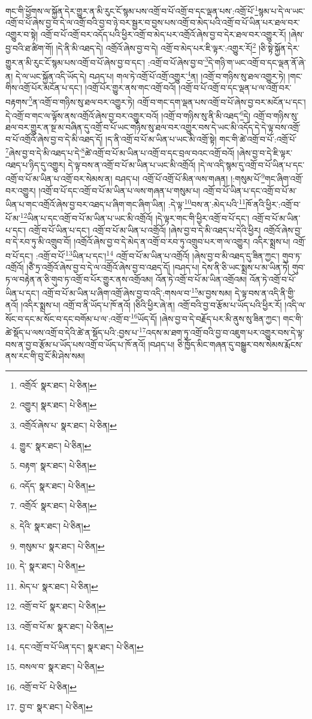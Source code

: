 གང་གི་ཕྱོགས་ལ་སྐྱོན་དེར་གྱུར་ན་མི་རུང་ངོ་སྙམ་པས་འགྲོ་བ་པོ་འགྲོ་བ་དང་ལྡན་པས་:འགྲོ་པོ་\footnote{འགྲོའོ་  སྣར་ཐང་།  པེ་ཅིན། }སྙམ་པ་དེ་ལ་ཡང་འགྲོ་བ་པོ་ཞེས་བྱ་བ་དེ་ལ་འགྲོ་བའི་བྱ་བ་ཉེ་བར་སྦྱར་བ་བྱས་པས་འགྲོ་བ་མེད་པའི་འགྲོ་བ་པོ་ཡིན་པར་ཐལ་བར་འགྱུར་བ་སྟེ། འགྲོ་བ་པོ་འགྲོ་བར་འདོད་པའི་ཕྱིར་འགྲོ་བ་མེད་པར་འགྲོའོ་ཞེས་བྱ་བ་དེར་ཐལ་བར་འགྱུར་རོ། །ཞེས་བྱ་བའི་ཐ་ཚིག་གོ། །དེ་ནི་མི་འཐད་དེ། འགྲོའོ་ཞེས་བྱ་བ་དེ། འགྲོ་བ་མེད་པར་ཇི་ལྟར་:འགྱུར་རོ།\footnote{འགྱུར།  སྣར་ཐང་།  པེ་ཅིན། } །ཅི་སྟེ་སྐྱོན་དེར་གྱུར་ན་མི་རུང་ངོ་སྙམ་པས་འགྲོ་བ་པོ་ཞེས་བྱ་བ་དང་། :འགྲོ་བ་པོ་ཞེས་བྱ་བ་\footnote{འགྲོའོ་ཞེས་པ་  སྣར་ཐང་།  པེ་ཅིན། }དེ་གཉི་ག་ཡང་འགྲོ་བ་དང་ལྡན་ནོ་ཞེ་ན། དེ་ལ་ཡང་སྐྱོན་འདི་ཡོད་དེ། བཤད་པ། གལ་ཏེ་འགྲོ་པོ་འགྲོ་འགྱུར་\footnote{གྱུར་  སྣར་ཐང་།  པེ་ཅིན། }ན། །འགྲོ་བ་གཉིས་སུ་ཐལ་འགྱུར་ཏེ། །གང་གིས་འགྲོ་པོར་མངོན་པ་དང་། །འགྲོ་པོར་གྱུར་ནས་གང་འགྲོ་བའོ། །འགྲོ་བ་པོ་འགྲོ་བ་དང་ལྡན་པ་ལ་འགྲོ་བར་བརྟགས་\footnote{བརྟག་  སྣར་ཐང་།  པེ་ཅིན། }ན་འགྲོ་བ་གཉིས་སུ་ཐལ་བར་འགྱུར་ཏེ། འགྲོ་བ་གང་དག་ལྡན་པས་འགྲོ་བ་པོ་ཞེས་བྱ་བར་མངོན་པ་དང་། དེ་འགྲོ་བ་གང་ལ་ལྟོས་ནས་འགྲོའོ་ཞེས་བྱ་བར་འགྱུར་བའོ། །འགྲོ་བ་གཉིས་སུ་ནི་མི་འཐད་\footnote{འདོད་  སྣར་ཐང་།  པེ་ཅིན། }དེ། འགྲོ་བ་གཉིས་སུ་ཐལ་བར་གྱུར་ན་སྔ་མ་བཞིན་དུ་འགྲོ་བ་པོ་ཡང་གཉིས་སུ་ཐལ་བར་འགྱུར་བས་དེ་ཡང་མི་འདོད་དེ་དེ་ལྟ་བས་འགྲོ་བ་པོ་འགྲོའོ་ཞེས་བྱ་བ་དེ་མི་འཐད་དོ། །ད་ནི་འགྲོ་བ་པོ་མ་ཡིན་པ་ཡང་མི་འགྲོ་སྟེ། གང་གི་ཚེ་འགྲོ་བ་པོ་:འགྲོ་པོ་\footnote{འགྲོའོ་  སྣར་ཐང་།  པེ་ཅིན། }ཞེས་བྱ་བ་དེ་མི་འཐད་པ་དེ་\footnote{དེའི་  སྣར་ཐང་།  པེ་ཅིན། }ཚེ་འགྲོ་བ་པོ་མ་ཡིན་པ་འགྲོ་བ་དང་བྲལ་བའང་འགྲོ་བའོ། །ཞེས་བྱ་བ་དེ་ཇི་ལྟར་འཐད་པ་ཉིད་དུ་འགྱུར། དེ་ལྟ་བས་ན་འགྲོ་བ་པོ་མ་ཡིན་པ་ཡང་མི་འགྲོའོ། །དེ་ལ་འདི་སྙམ་དུ་འགྲོ་བ་པོ་ཡིན་པ་དང་འགྲོ་བ་པོ་མ་ཡིན་པ་འགྲོ་བར་སེམས་ན། བཤད་པ། འགྲོ་པོ་འགྲོ་པོ་མིན་ལས་གཞན། །:གསུམ་པོ་\footnote{གསུམ་པ་  སྣར་ཐང་།  པེ་ཅིན། }གང་ཞིག་འགྲོ་བར་འགྱུར། །འགྲོ་བ་པོ་དང་འགྲོ་བ་པོ་མ་ཡིན་པ་ལས་གཞན་པ་གསུམ་པ། འགྲོ་བ་པོ་ཡིན་པ་དང་འགྲོ་བ་པོ་མ་ཡིན་པ་གང་འགྲོའོ་ཞེས་བྱ་བར་འཐད་པ་ཞིག་གང་ཞིག་ཡིན། :དེ་ལྟ་\footnote{དེ་  སྣར་ཐང་།  པེ་ཅིན། }བས་ན་:མེད་པའི་\footnote{མེད་པ་  སྣར་ཐང་།  པེ་ཅིན། }ཁོ་ནའི་ཕྱིར་:འགྲོ་བ་པོ་མ་\footnote{འགྲོ་བ་པོ་  སྣར་ཐང་།  པེ་ཅིན། }ཡིན་པ་དང་འགྲོ་བ་པོ་མ་ཡིན་པ་ཡང་མི་འགྲོའོ། །དེ་ལྟར་གང་གི་ཕྱིར་འགྲོ་བ་པོ་དང་། འགྲོ་བ་པོ་མ་ཡིན་པ་དང་། འགྲོ་བ་པོ་ཡིན་པ་དང་། འགྲོ་བ་པོ་མ་ཡིན་པ་འགྲོའོ། །ཞེས་བྱ་བ་དེ་མི་འཐད་པ་དེའི་ཕྱིར། འགྲོའོ་ཞེས་བྱ་བ་དེ་རབ་ཏུ་མི་འགྲུབ་བོ། །འགྲོའོ་ཞེས་བྱ་བ་དེ་མེད་ན་འགྲོ་བ་རབ་ཏུ་འགྲུབ་པར་ག་ལ་འགྱུར། འདིར་སྨྲས་པ། འགྲོ་བ་པོ་དང་། :འགྲོ་བ་པོ་\footnote{འགྲོ་བ་པོ་མ་  སྣར་ཐང་།  པེ་ཅིན། }ཡིན་པ་དང་།\footnote{དང་འགྲོ་བ་པོ་ཡིན་དང་།  སྣར་ཐང་།  པེ་ཅིན། } འགྲོ་བ་པོ་མ་ཡིན་པ་འགྲོའོ། །ཞེས་བྱ་བ་མི་འཐད་དུ་ཟིན་ཀྱང་། གུབ་ཏ་འགྲོའོ། །ཙཻ་ཏྲ་འགྲོའོ་ཞེས་བྱ་བ་དེ་ལ་འགྲོའོ་ཞེས་བྱ་བ་འཐད་དོ། །བཤད་པ། དེས་ནི་ཅི་ཡང་སྨྲས་པ་མ་ཡིན་ཏེ། གུབ་ཏ་ལ་བརྟེན་ན་ཅི་གུབ་ཏ་འགྲོ་བ་པོར་གྱུར་ནས་འགྲོའམ། འོན་ཏེ་འགྲོ་བ་པོ་མ་ཡིན་འགྲོའམ། འོན་ཏེ་འགྲོ་བ་པོ་ཡིན་པ་དང་། འགྲོ་བ་པོ་མ་ཡིན་པ་ཞིག་འགྲོ་ཞེས་བྱ་བ་འདི་:གསལ་བ་\footnote{བསལ་བ་  སྣར་ཐང་།  པེ་ཅིན། }མ་བྱས་སམ། དེ་ལྟ་བས་ན་འདི་ནི་གྱི་ནའོ། །འདིར་སྨྲས་པ། འགྲོ་བ་ནི་ཡོད་པ་ཁོ་ནའོ། །ཅིའི་ཕྱིར་ཞེ་ན། འགྲོ་བའི་བྱ་བ་རྩོམ་པ་ཡོད་པའི་ཕྱིར་རོ། །འདི་ལ་སོང་བ་དང་མ་སོང་བ་དང་བགོམ་པ་ལ་:འགྲོ་བ་\footnote{འགྲོ་བ་པོ་  པེ་ཅིན། }ཡོད་དོ། །ཞེས་བྱ་བ་དེ་བརྗོད་པར་མི་ནུས་སུ་ཟིན་ཀྱང་། གང་གི་ཚེ་སྡོད་པ་ལས་འགྲོ་བ་དེའི་ཚེ་ན་སྡོད་པའི་:བྱས་པ་\footnote{བྱ་བ་  སྣར་ཐང་།  པེ་ཅིན། }འདས་མ་ཐག་ཏུ་འགྲོ་བའི་བྱ་བ་འཇུག་པར་འགྱུར་བས་དེ་ལྟ་བས་ན་བྱ་བ་རྩོམ་པ་ཡོད་པས་འགྲོ་བ་ཡོད་པ་ཁོ་ནའོ། །བཤད་པ། ཅི་ཁྱོད་མིང་གཞན་དུ་བསྒྱུར་བས་སེམས་རྨོངས་ནས་རང་གི་བུ་ངོ་མི་ཤེས་སམ། 
